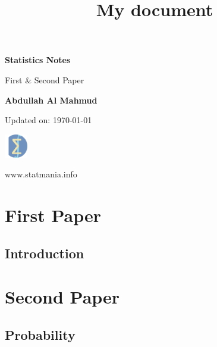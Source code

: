 \documentclass[14pt, a4paper,oneside, margin=1.4in]{book}
\title{My document}
\begin{document}
\frontmatter

\begin{titlepage}
    \begin{center}
        \vspace*{1cm}
            
        \Huge
        \textbf{Statistics Notes}
            
        \vspace{0.5cm}
        \huge
        First \& Second Paper
            
        \vspace{1.5cm}
            
        \textbf{Abdullah Al Mahmud}

     \vspace{1.5cm}

	\Large 
	Updated on: \today
            
        \vfill
            

            
        \vspace{0.8cm}
            
\includegraphics[width=1cm]{logo.png}
            
        \Large
        www.statmania.info\\
            
    \end{center}
\end{titlepage}


\tableofcontents


\mainmatter
\part {First Paper}

\chapter{Introduction}

\part {Second Paper}
\chapter{Probability} 
\end{document}
